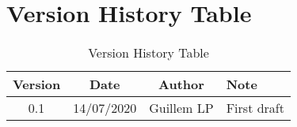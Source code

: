 \section{Version History Table}

\begin{table}[h]
	\centering
	\begin{tabular}{|c|c|c|l|}
		\hline
		Version & Date       & Author     & Note                                \\ \hline
		0.1     & 14/07/2020 & Guillem LP & First draft                         \\ \hline
	\end{tabular}
	\caption{Version History Table}
	\label{tab:version-table}
\end{table}